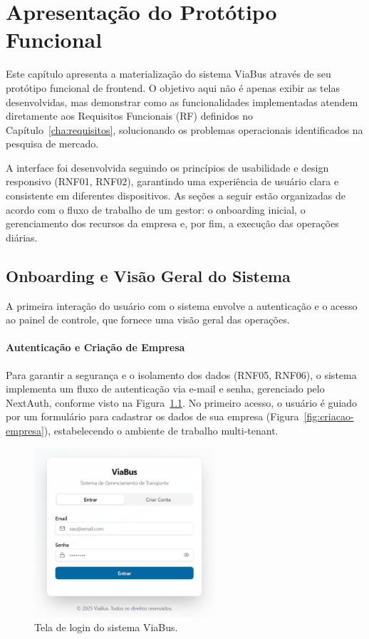 \chapter{Apresentação do Protótipo Funcional}
\label{cha:funcionalidades}

Este capítulo apresenta a materialização do sistema ViaBus através de seu protótipo funcional de frontend. O objetivo aqui não é apenas exibir as telas desenvolvidas, mas demonstrar como as funcionalidades implementadas atendem diretamente aos Requisitos Funcionais (RF) definidos no Capítulo~\ref{cha:requisitos}, solucionando os problemas operacionais identificados na pesquisa de mercado.

A interface foi desenvolvida seguindo os princípios de usabilidade e design responsivo (RNF01, RNF02), garantindo uma experiência de usuário clara e consistente em diferentes dispositivos. As seções a seguir estão organizadas de acordo com o fluxo de trabalho de um gestor: o onboarding inicial, o gerenciamento dos recursos da empresa e, por fim, a execução das operações diárias.

\section{Onboarding e Visão Geral do Sistema}

A primeira interação do usuário com o sistema envolve a autenticação e o acesso ao painel de controle, que fornece uma visão geral das operações.

\subsubsection{Autenticação e Criação de Empresa}
Para garantir a segurança e o isolamento dos dados (RNF05, RNF06), o sistema implementa um fluxo de autenticação via e-mail e senha, gerenciado pelo NextAuth, conforme visto na Figura~\ref{fig:tela-login}. No primeiro acesso, o usuário é guiado por um formulário para cadastrar os dados de sua empresa (Figura~\ref{fig:criacao-empresa}), estabelecendo o ambiente de trabalho multi-tenant.

\begin{figure}[H]
  \centering
  \includegraphics[width=0.6\textwidth]{imagens/tela-login.png}
  \caption{Tela de login do sistema ViaBus.}
  \label{fig:tela-login}
\end{figure}

